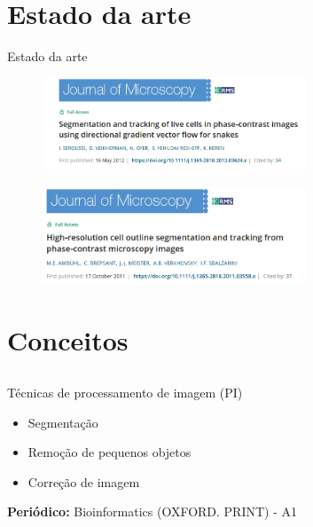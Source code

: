 \documentclass{beamer}
\begin{document}
\section{Estado da arte}
\begin{frame}{Estado da arte}

    \begin{figure}
      \includegraphics[width=0.7\textwidth]{imgs/j1.png}
    \end{figure}
    \begin{figure}
\includegraphics[width=0.7\textwidth]{imgs/j2.png}
    \end{figure}

\end{frame}

\section{Conceitos}
\subsection{}
\begin{frame}{Técnicas de processamento de imagem (PI)}
 \begin{itemize}
 \item Segmentação
 \item Remoção de pequenos objetos
 \item Correção de imagem
   \end{itemize}

   \vfill

  {\bf Periódico:} Bioinformatics (OXFORD. PRINT) - A1
\end{frame}
\end{document}
